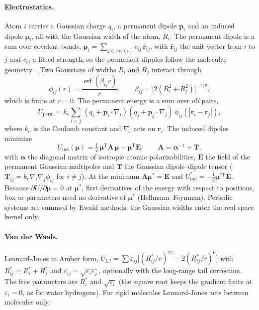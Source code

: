 \documentclass[11pt]{article}
\begin{document}
\paragraph{Electrostatics.}
Atom $i$ carries a Gaussian charge $q_i$, a permanent dipole $\bm p_i$ and an induced dipole
$\bm\mu_i$, all with the Gaussian width of the atom, $R_i$. The permanent dipole is a sum over
covalent bonds, $\bm p_i=\sum_{j\in\mathrm{cov}(i)} c_{ij}\,\hat{\bm r}_{ij}$, with
$\hat{\bm r}_{ij}$ the unit vector from $i$ to $j$ and $c_{ij}$ a fitted strength, so the
permanent dipoles follow the molecular geometry~\cite{wei2020pgm}. Two Gaussians of widths $R_i$
and $R_j$ interact through
\begin{equation}
\phi_{ij}(r)=\frac{\operatorname{erf}(\beta_{ij}r)}{r},\qquad
\beta_{ij}=\bigl[2(R_i^2+R_j^2)\bigr]^{-1/2},
\end{equation}
which is finite at $r=0$. The permanent energy is a sum over \emph{all} pairs,
\begin{equation}
U_\mathrm{perm}=k_e\sum_{i<j}\,(q_i+\bm p_i\cdot\nabla_i)(q_j+\bm p_j\cdot\nabla_j)\,
\phi_{ij}(|\bm r_i-\bm r_j|),
\end{equation}
where $k_e$ is the Coulomb constant and $\nabla_i$ acts on $\bm r_i$. The induced dipoles
minimize
\begin{equation}\label{eq:functional}
U_\mathrm{ind}(\bm\mu)=\tfrac12\,\bm\mu^\mathsf{T}\bm A\,\bm\mu-\bm\mu^\mathsf{T}\bm E,\qquad
\bm A=\bm\alpha^{-1}+\bm T,
\end{equation}
with $\bm\alpha$ the diagonal matrix of isotropic atomic polarizabilities, $\bm E$ the field of
the permanent Gaussian multipoles and $\bm T$ the Gaussian dipole--dipole tensor
($\bm T_{ij}=k_e\nabla_i\nabla_j\phi_{ij}$ for $i\neq j$). At the minimum
$\bm A\bm\mu^*=\bm E$ and $U_\mathrm{ind}^*=-\tfrac12\bm\mu^{*\mathsf T}\bm E$. Because
$\partial U/\partial\bm\mu=0$ at $\bm\mu^*$, first derivatives of the energy with respect to
positions, box or parameters need no derivative of $\bm\mu^*$ (Hellmann--Feynman). Periodic
systems are summed by Ewald methods; the Gaussian widths enter the real-space kernel only.

\paragraph{Van der Waals.} Lennard-Jones in Amber form,
$U_\mathrm{LJ}=\sum\varepsilon_{ij}\bigl[(R^*_{ij}/r)^{12}-2(R^*_{ij}/r)^6\bigr]$ with
$R^*_{ij}=R^*_i+R^*_j$ and $\varepsilon_{ij}=\sqrt{\varepsilon_i\varepsilon_j}$, optionally with
the long-range tail correction. The free parameters are $R^*_i$ and $\sqrt{\varepsilon_i}$ (the
square root keeps the gradient finite at $\varepsilon_i=0$, as for water hydrogens). For rigid
molecules Lennard-Jones acts between molecules only.
\end{document}
